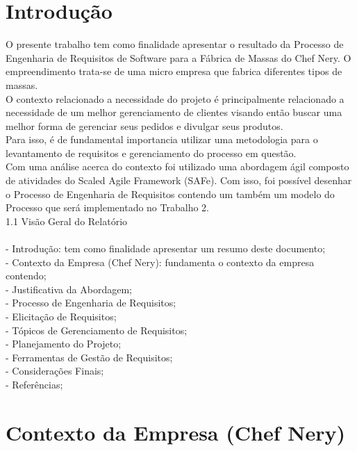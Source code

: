 \newcommand\tab[1][1cm]{\hspace*{#1}}

\section{Introdução}\label{sec}
\tab O presente trabalho tem como finalidade apresentar o resultado da Processo de Engenharia de Requisitos de Software para a Fábrica de Massas do Chef Nery. O empreendimento trata-se de uma micro empresa que fabrica diferentes tipos de massas.\\
\tab O contexto relacionado a necessidade do projeto é principalmente relacionado a necessidade de um melhor gerenciamento de clientes visando então buscar uma melhor forma de gerenciar seus pedidos e divulgar seus produtos.\\
\tab Para isso, é de fundamental importancia utilizar uma metodologia para o levantamento de requisitos e gerenciamento do processo em questão.\\
\tab Com uma análise acerca do contexto foi utilizado uma abordagem ágil composto de atividades do Scaled Agile Framework (SAFe). Com isso, foi possível desenhar o Processo de Engenharia de Requisitos contendo um também um modelo do Processo que será implementado no Trabalho 2.\\

{\large{1.1 Visão Geral do Relatório}}\\ \\
\tab - Introdução: tem como finalidade apresentar um resumo deste documento;\\
\tab - Contexto da Empresa (Chef Nery): fundamenta o contexto da empresa contendo;\\
\tab - Justificativa da Abordagem;\\
\tab - Processo de Engenharia de Requisitos;\\
\tab - Elicitação de Requisitos;\\
\tab - Tópicos de Gerenciamento de Requisitos;\\
\tab - Planejamento do Projeto;\\
\tab - Ferramentas de Gestão de Requisitos;\\
\tab - Considerações Finais;\\
\tab - Referências;\\


\section{Contexto da Empresa (Chef Nery)} %
\label{sec:nova_sess_o}

